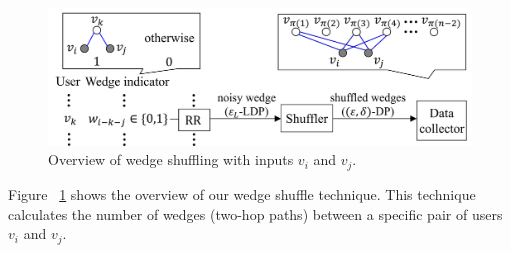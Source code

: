 \begin{figure}[t]
  \centering
  \includegraphics[width=0.99\linewidth]{fig/wedge_shuffle.pdf}
  \vspace{-2mm}
  \caption{Overview of wedge shuffling with inputs $v_i$ and $v_j$. 
  }
  \label{chap3-fig:wedge_shuffle}
\end{figure}



Figure ~\ref{chap3-fig:wedge_shuffle} shows the overview of our wedge shuffle technique. 
This technique calculates the number of wedges (two-hop paths) between 
a specific pair of users $v_i$ and $v_j$. 

